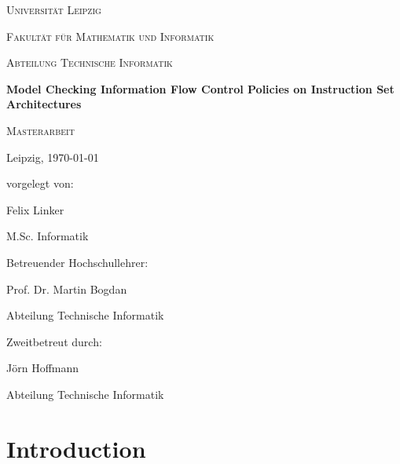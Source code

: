 \documentclass[headings=standardclasses]{scrbook}
\theoremstyle{remark}
\begin{document}
\begin{titlepage}
    \centering
    \par
    \vspace{1cm}
    {\scshape\LARGE Universität Leipzig} \par
    \vspace{0.3cm}
    {\scshape\Large Fakultät für Mathematik und Informatik} \par
    {\scshape\Large Abteilung Technische Informatik} \par
    \vspace{2.3cm}
    {\huge\bfseries Model Checking Information Flow Control Policies on Instruction Set Architectures} \par
    \vspace{1.5cm}
    {\scshape\Large Masterarbeit} \par
    \vspace{1.8cm}
    \begin{multicols}{2}
        Leipzig, \today \par
        \columnbreak
        vorgelegt von: \par
        Felix Linker \par
        M.Sc. Informatik
    \end{multicols}
    \vfill
    \begin{multicols}{2}
        Betreuender Hochschullehrer: \par
        Prof. Dr. Martin Bogdan \par
        Abteilung Technische Informatik \par
        \columnbreak
        Zweitbetreut durch: \par
        Jörn Hoffmann \par
        Abteilung Technische Informatik
    \end{multicols}
\end{titlepage}

\pagestyle{empty}
\renewcommand{\chapterpagestyle}{empty}



\tableofcontents

\printnoidxglossary[type=acronym]

\pagestyle{plain}
\renewcommand{\chapterpagestyle}{plain}
\setcounter{page}{1}

\part{Introduction}


\end{document}
